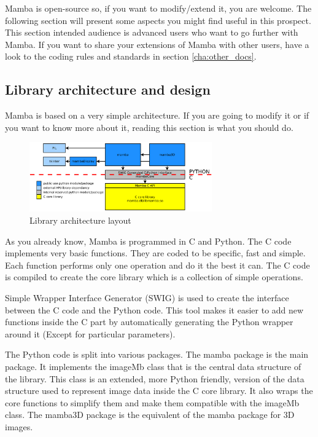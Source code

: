 \documentclass[a4paper,10pt,oneside]{article}
\begin{document}
Mamba is open-source so, if you want to modify/extend it, you are welcome. The
following section will present some aspects you might find useful in this
prospect. This section intended audience is advanced users who want to go 
further with Mamba. If you want to share your extensions of Mamba with other users,
have a look to the coding rules and standards in section \ref{cha:other_docs}. 

\subsection{Library architecture and design}
\label{cha:lib_arch}

Mamba is based on a very simple architecture. If you are going to modify it or
if you want to know more about it, reading this section is what you should do.

\begin{figure}
\centering
\includegraphics[width=0.7\textwidth]{figures/archi.pdf}
\caption{Library architecture layout}
\label{fig:archi_lay}
\end{figure}

As you already know, Mamba is programmed in C and Python. The C code implements
very basic functions. They are coded to be specific, fast and simple. Each 
function performs only one operation and do it the best it can. The C code is 
compiled to create the core library which is a collection of simple operations.

Simple Wrapper Interface Generator (SWIG) is used to create the interface 
between the C code and the Python code. This tool makes it easier to add new
functions inside the C part by automatically generating the Python wrapper
around it (Except for particular parameters).

The Python code is split into various packages. The mamba package is the 
main package. It implements the imageMb class that is the
central data structure of the library. This class is an extended, more Python
friendly, version of the data structure used to represent image data inside the
C core library. It also wraps the core functions to simplify them
and make them compatible with the imageMb class. The mamba3D package is the
equivalent of the mamba package for 3D images.
\end{document}
